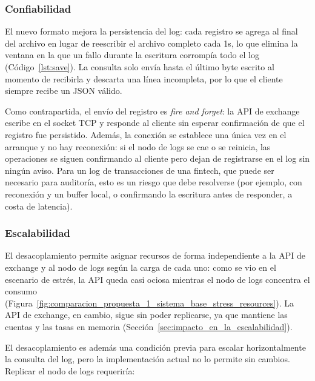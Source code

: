         \subsubsection{Confiabilidad}
        \label{sec:propuesta_1_confiabilidad}

        El nuevo formato mejora la persistencia del log: cada registro se agrega al final del archivo en lugar de reescribir el
        archivo completo cada 1s, lo que elimina la ventana en la que un fallo durante la escritura corrompía todo el log (Código~\ref{lst:save}).
        La consulta solo envía hasta el último byte escrito al momento de recibirla y descarta una línea incompleta, por lo que
        el cliente siempre recibe un JSON válido.

        Como contrapartida, el envío del registro es \textit{fire and forget}: la API de exchange escribe en el socket TCP y
        responde al cliente sin esperar confirmación de que el registro fue persistido. Además, la conexión se establece una
        única vez en el arranque y no hay reconexión: si el nodo de logs se cae o se reinicia, las operaciones se siguen
        confirmando al cliente pero dejan de registrarse en el log sin ningún aviso. Para un log de transacciones de una
        fintech, que puede ser necesario para auditoría, esto es un riesgo que debe resolverse (por ejemplo, con reconexión y un
        buffer local, o confirmando la escritura antes de responder, a costa de latencia).

        \subsubsection{Escalabilidad}
        \label{sec:propuesta_1_escalabilidad}

        El desacoplamiento permite asignar recursos de forma independiente a la API de exchange y al nodo de logs según la carga
        de cada uno: como se vio en el escenario de estrés, la API queda casi ociosa mientras el nodo de logs concentra el
        consumo (Figura~\ref{fig:comparacion_propuesta_1_sistema_base_stress_resources}). La API de exchange, en cambio, sigue
        sin poder replicarse, ya que mantiene las cuentas y las tasas en memoria (Sección~\ref{sec:impacto_en_la_escalabilidad}).

        El desacoplamiento es además una condición previa para escalar horizontalmente la consulta del log, pero la
        implementación actual no lo permite sin cambios. Replicar el nodo de logs requeriría:

